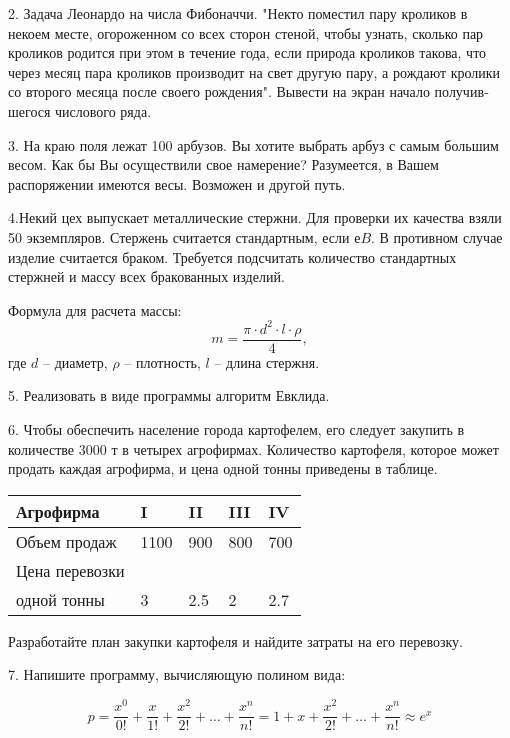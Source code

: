 2. Задача Леонардо на числа Фибоначчи. "Некто поместил пару кроликов в некоем месте, огороженном со всех сторон стеной, чтобы узнать, сколько пар кроликов родится при этом в течение года, если природа кроликов такова, что через месяц пара кроликов производит на свет другую пару, а рождают кролики со второго месяца после своего рождения". Вывести на экран начало получив­шегося числового ряда.

3. На краю поля лежат 100 арбузов. Вы хотите выбрать арбуз с самым большим весом. Как бы Вы осуществили свое намерение? Разумеется, в Вашем распоряжении имеются весы. Возможен и другой путь.
    
4.Некий цех выпускает металлические стержни. Для проверки их качества взяли 50 экземпляров. Стержень считается стандартным, если е$B$. В противном случае изделие считается браком. Требуется подсчитать количест­во стандартных стержней и массу всех бракованных изделий.

Формула для расчета массы:   $$m = \frac{\pi\cdot d^2\cdot l\cdot \rho}{4}, $$
где $d$ -- диаметр, $\rho$ -- плотность,   $l$ -- длина стержня.

5. Реализовать в виде программы алгоритм Евклида.

6. Чтобы обеспечить население города картофелем, его следу­ет закупить в количестве 3000 т в четырех агрофирмах. Количест­во картофеля, которое может продать каждая агрофирма, и цена одной тонны приведены в таблице.

\begin{center}
\begin{tabular}{ | l | l | l |  l |  l |} \hline
Агрофирма & I  &  II  &  III  &  IV   \\   \hline
Объем продаж & 1100  &  900  &  800  &  700   \\   \hline
Цена перевозки &    &     &     &      \\   
одной тонны & 3  &  2.5  &  2  &  2.7     \\   \hline
\end{tabular}
\end{center}
\vspace{5mm}

Разработайте план закупки картофеля и найдите затраты на его перевозку.

7. Напишите программу, вычисляющую полином вида:

$$ p = \frac{x^0}{0!}+\frac{x}{1!}+\frac{x^2}{2!}+ \ldots + \frac{x^n}{n!} = 1 + x + \frac{x^2}{2!} + \ldots + \frac{x^n}{n!}  \approx e^x$$


